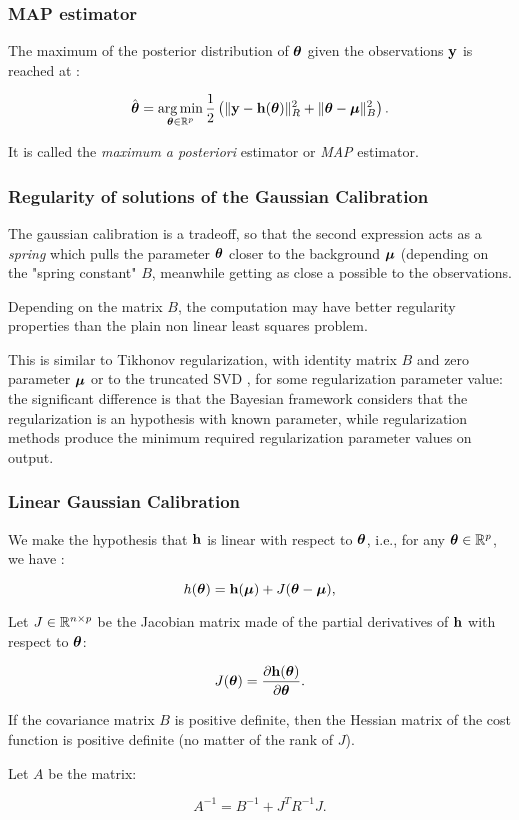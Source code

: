 \documentclass[aspectratio=169]{beamer}
\begin{document}
\begin{frame}
\frametitle{MAP estimator}

The maximum of the posterior distribution of $\boldsymbol{\theta}$ given
the observations ${\bf y}$ is reached at :

$$
   \hat{\boldsymbol{\theta}} = \operatorname*{arg\,min}_{\boldsymbol{\theta}\in\mathbb{R}^p} \frac{1}{2} \left( \|{\bf y} - {\bf h}(\boldsymbol{\theta})\|^2_R 
   + \|\boldsymbol{\theta}-\boldsymbol{\mu} \|^2_B \right).
$$

It is called the \emph{maximum a posteriori} estimator or \emph{MAP}
estimator.
\end{frame}

\begin{frame}
\frametitle{Regularity of solutions of the Gaussian Calibration}

The gaussian calibration is a tradeoff, so that the second expression
acts as a \emph{spring} which pulls the parameter $\boldsymbol{\theta}$
closer to the background $\boldsymbol{\mu}$ (depending on the "spring
constant" $B$, meanwhile getting as close a possible to the
observations. 

Depending on the matrix $B$, the computation may
have better regularity properties than the plain non linear least
squares problem.

This is similar to Tikhonov regularization, with identity 
matrix $B$ and zero parameter $\boldsymbol{\mu}$ \cite{mueller2012linear} or to 
the truncated SVD \cite{Hansen00thelcurve}, for some 
regularization parameter value: the significant difference is that the 
Bayesian framework considers that the regularization is an hypothesis with 
known parameter, while regularization methods produce the minimum 
required regularization parameter values on output. 
\end{frame}

\begin{frame}
\frametitle{Linear Gaussian Calibration}
We make the hypothesis that ${\bf h}$ is linear with respect to
$\boldsymbol{\theta}$, i.e., for any
$\boldsymbol{\theta}\in\mathbb{R}^p$, we have :

$$
h(\boldsymbol{\theta}) = {\bf h}(\boldsymbol{\mu}) + J(\boldsymbol{\theta}-\boldsymbol{\mu} ),
$$

Let $J \in \mathbb{R}^{n \times p}$ be the Jacobian matrix made of
the partial derivatives of ${\bf h}$ with respect to
$\boldsymbol{\theta}$:

$$
J(\boldsymbol{\theta}) = \frac{\partial {\bf h} (\boldsymbol{\theta})}{\partial \boldsymbol{\theta}}.
$$

If the covariance matrix $B$ is positive definite, then the
Hessian matrix of the cost function is positive definite 
(no matter of the rank of $J$). 


Let $A$ be the matrix:

$$
A^{-1} = B^{-1} + J^T R^{-1} J.
$$



\end{frame}
\end{document}
